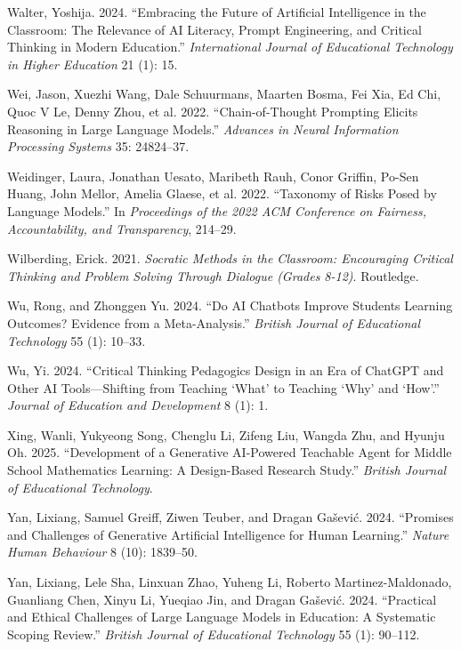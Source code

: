 \documentclass[
  12pt,
]{article}
\newlength{\cslhangindent}
\newenvironment{CSLReferences}[2] %
 {\begin{list}{}{%
  \setlength{\itemindent}{0pt}
  \setlength{\leftmargin}{0pt}
  \setlength{\parsep}{0pt}
  \ifodd #1
   \setlength{\leftmargin}{\cslhangindent}
   \setlength{\itemindent}{-1\cslhangindent}
  \fi
  \setlength{\itemsep}{#2\baselineskip}}}
 {\end{list}}
\begin{document}
\begin{CSLReferences}{1}{0}
Walter, Yoshija. 2024. {``Embracing the Future of Artificial Intelligence in the Classroom: The Relevance of AI Literacy, Prompt Engineering, and Critical Thinking in Modern Education.''} \emph{International Journal of Educational Technology in Higher Education} 21 (1): 15.

Wei, Jason, Xuezhi Wang, Dale Schuurmans, Maarten Bosma, Fei Xia, Ed Chi, Quoc V Le, Denny Zhou, et al. 2022. {``Chain-of-Thought Prompting Elicits Reasoning in Large Language Models.''} \emph{Advances in Neural Information Processing Systems} 35: 24824--37.

Weidinger, Laura, Jonathan Uesato, Maribeth Rauh, Conor Griffin, Po-Sen Huang, John Mellor, Amelia Glaese, et al. 2022. {``Taxonomy of Risks Posed by Language Models.''} In \emph{Proceedings of the 2022 ACM Conference on Fairness, Accountability, and Transparency}, 214--29.

Wilberding, Erick. 2021. \emph{Socratic Methods in the Classroom: Encouraging Critical Thinking and Problem Solving Through Dialogue (Grades 8-12)}. Routledge.

Wu, Rong, and Zhonggen Yu. 2024. {``Do AI Chatbots Improve Students Learning Outcomes? Evidence from a Meta-Analysis.''} \emph{British Journal of Educational Technology} 55 (1): 10--33.

Wu, Yi. 2024. {``Critical Thinking Pedagogics Design in an Era of ChatGPT and Other AI Tools---Shifting from Teaching {`What'} to Teaching {`Why'} and {`How'}.''} \emph{Journal of Education and Development} 8 (1): 1.

Xing, Wanli, Yukyeong Song, Chenglu Li, Zifeng Liu, Wangda Zhu, and Hyunju Oh. 2025. {``Development of a Generative AI-Powered Teachable Agent for Middle School Mathematics Learning: A Design-Based Research Study.''} \emph{British Journal of Educational Technology}.

Yan, Lixiang, Samuel Greiff, Ziwen Teuber, and Dragan Gašević. 2024. {``Promises and Challenges of Generative Artificial Intelligence for Human Learning.''} \emph{Nature Human Behaviour} 8 (10): 1839--50.

Yan, Lixiang, Lele Sha, Linxuan Zhao, Yuheng Li, Roberto Martinez-Maldonado, Guanliang Chen, Xinyu Li, Yueqiao Jin, and Dragan Gašević. 2024. {``Practical and Ethical Challenges of Large Language Models in Education: A Systematic Scoping Review.''} \emph{British Journal of Educational Technology} 55 (1): 90--112.


\end{CSLReferences}
\end{document}
